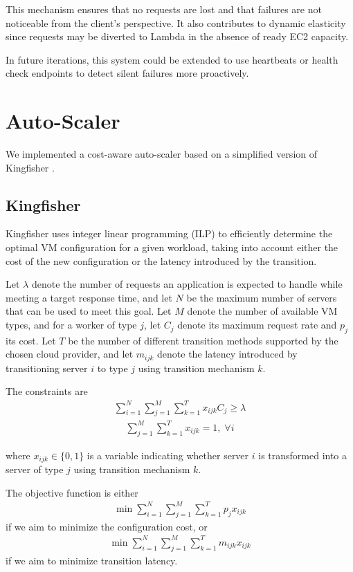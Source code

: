 \documentclass[conference]{IEEEtran}
\begin{document}
This mechanism ensures that no requests are lost and that failures are not
noticeable from the client’s perspective. It also contributes to dynamic
elasticity since requests may be diverted to Lambda in the absence of ready EC2
capacity.

In future iterations, this system could be extended to use heartbeats or health
check endpoints to detect silent failures more proactively.

\section{Auto-Scaler}
We implemented a cost-aware auto-scaler based on a simplified version of
Kingfisher \cite{kingfisher}.

\subsection{Kingfisher}
Kingfisher uses integer linear programming (ILP) to efficiently determine the
optimal VM configuration for a given workload, taking into account either the
cost of the new configuration or the latency introduced by the transition.

Let $\lambda$ denote the number of requests an application is expected to handle
while meeting a target response time, and let $N$ be the maximum number of
servers that can be used to meet this goal. Let $M$ denote the number of
available VM types, and for a worker of type $j$, let $C_j$ denote its maximum
request rate and $p_j$ its cost. Let $T$ be the number of different transition
methods supported by the chosen cloud provider, and let $m_{ijk}$ denote the
latency introduced by transitioning server $i$ to type $j$ using transition
mechanism $k$.

The constraints are
\begin{align}
    \sum_{i = 1}^N \sum_{j = 1}^M \sum_{k = 1}^T x_{ijk} C_j \ge \lambda
\end{align}
\begin{align}
    \sum_{j = 1}^M \sum_{k = 1}^T x_{ijk} = 1,\; \forall i
\end{align}

where $x_{ijk} \in \{0, 1\}$ is a variable indicating whether server $i$ is
transformed into a server of type $j$ using transition mechanism $k$.

The objective function is either
\begin{align}
    \min \sum_{i = 1}^N \sum_{j = 1}^M \sum_{k = 1}^T p_j x_{ijk}
\end{align}
if we aim to minimize the configuration cost, or
\begin{align}
    \min \sum_{i = 1}^N \sum_{j = 1}^M \sum_{k = 1}^T m_{ijk} x_{ijk}
\end{align}
if we aim to minimize transition latency.
\end{document}
